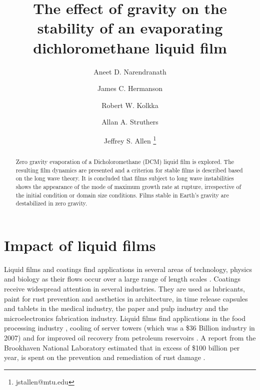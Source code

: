 \documentclass[a4paper,12pt]{article}
\title{The effect of gravity on the stability of an evaporating dichloromethane liquid film}
\author[1]{Aneet D. Narendranath}
\author[2]{James C. Hermanson}
\author[3]{Robert W. Kolkka}
\author[3]{Allan A. Struthers}
\author[1]{Jeffrey S. Allen \thanks{jstallen@mtu.edu}}
\affil[1]{Mechanical Engineering-Engineering Mechanics, Michigan Technological University, Houghton, MI}
\affil[2]{Aeronautics \& Astronautics, University of Washington, Seattle, WA}
\affil[3]{Mathematical Sciences, Michigan Technological University, Houghton, MI}
\begin{document}
\maketitle 

\begin{abstract}
\noindent Zero gravity evaporation of a Dicholoromethane (DCM) liquid film is explored. The resulting film dynamics are presented and a criterion for stable films is described based on the long wave theory. It is concluded that films subject to long wave instabilities shows the appearance of the mode of maximum growth rate at rupture, irrespective of the initial condition or domain size conditions. Films stable in Earth's gravity are destabilized in zero gravity.

\end{abstract}



\section{Impact of liquid films}
Liquid films and coatings find applications in several areas of technology, physics and biology as their flows occur over a large range of length scales \citep{Craster2009a}. Coatings receive widespread attention in several industries. They are used as lubricants, paint for rust prevention and aesthetics in architecture, in time release capsules and tablets in the medical industry, the paper and pulp industry and the microelectronics fabrication industry. Liquid films find applications in the food processing industry \citep{Pehlivan2012a, Moresi1988a}, cooling of server towers (which was a \$36 Billion industry in 2007) \citep{Agostini2007a, Darabi2003a, Marcinichen2010a} and for improved oil recovery from petroleum reservoirs \citep{Schramm1992a, Bergeron1993a}. A report from the Brookhaven National Laboratory estimated that in excess of \$100 billion per year, is spent on the prevention and remediation of rust damage \citep{Cheremisinoff2003a}.\\
\end{document}
